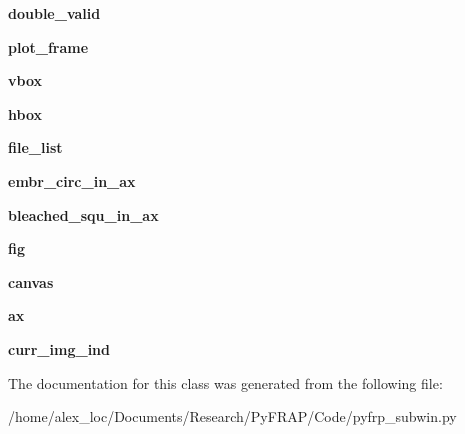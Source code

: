 \begin{DoxyCompactItemize}
\item 
\hypertarget{classpyfrp__subwin_1_1dataset__dialog_ad56a23783aa85c4b41facb9638f03760}{{\bfseries double\+\_\+valid}}\label{classpyfrp__subwin_1_1dataset__dialog_ad56a23783aa85c4b41facb9638f03760}

\item 
\hypertarget{classpyfrp__subwin_1_1dataset__dialog_acb31d11c26f7fe812fe364cf71338f02}{{\bfseries plot\+\_\+frame}}\label{classpyfrp__subwin_1_1dataset__dialog_acb31d11c26f7fe812fe364cf71338f02}

\item 
\hypertarget{classpyfrp__subwin_1_1dataset__dialog_ae24240e2dba1f4f12ee715fbc3ba61b5}{{\bfseries vbox}}\label{classpyfrp__subwin_1_1dataset__dialog_ae24240e2dba1f4f12ee715fbc3ba61b5}

\item 
\hypertarget{classpyfrp__subwin_1_1dataset__dialog_ace2f8210b483ad1c7e4a00847debce99}{{\bfseries hbox}}\label{classpyfrp__subwin_1_1dataset__dialog_ace2f8210b483ad1c7e4a00847debce99}

\item 
\hypertarget{classpyfrp__subwin_1_1dataset__dialog_a220f22596aa9ddd07e65716add38ff86}{{\bfseries file\+\_\+list}}\label{classpyfrp__subwin_1_1dataset__dialog_a220f22596aa9ddd07e65716add38ff86}

\item 
\hypertarget{classpyfrp__subwin_1_1dataset__dialog_afb8d536b0ac937cd0462d01da03dbc5e}{{\bfseries embr\+\_\+circ\+\_\+in\+\_\+ax}}\label{classpyfrp__subwin_1_1dataset__dialog_afb8d536b0ac937cd0462d01da03dbc5e}

\item 
\hypertarget{classpyfrp__subwin_1_1dataset__dialog_a36baea3ca286cdc7788f7046db808e38}{{\bfseries bleached\+\_\+squ\+\_\+in\+\_\+ax}}\label{classpyfrp__subwin_1_1dataset__dialog_a36baea3ca286cdc7788f7046db808e38}

\item 
\hypertarget{classpyfrp__subwin_1_1dataset__dialog_ac110b7db73fa5c58a246d64ce6c3bd46}{{\bfseries fig}}\label{classpyfrp__subwin_1_1dataset__dialog_ac110b7db73fa5c58a246d64ce6c3bd46}

\item 
\hypertarget{classpyfrp__subwin_1_1dataset__dialog_ad424cf7c8d39c30ed9a6a38c24fbc7e8}{{\bfseries canvas}}\label{classpyfrp__subwin_1_1dataset__dialog_ad424cf7c8d39c30ed9a6a38c24fbc7e8}

\item 
\hypertarget{classpyfrp__subwin_1_1dataset__dialog_accb1494c245e70d828101bacf82d91b5}{{\bfseries ax}}\label{classpyfrp__subwin_1_1dataset__dialog_accb1494c245e70d828101bacf82d91b5}

\item 
\hypertarget{classpyfrp__subwin_1_1dataset__dialog_aacfbaf31963675058dc4291dabc3c4f5}{{\bfseries curr\+\_\+img\+\_\+ind}}\label{classpyfrp__subwin_1_1dataset__dialog_aacfbaf31963675058dc4291dabc3c4f5}

\end{DoxyCompactItemize}


The documentation for this class was generated from the following file\+:\begin{DoxyCompactItemize}
\item 
/home/alex\+\_\+loc/\+Documents/\+Research/\+Py\+F\+R\+A\+P/\+Code/pyfrp\+\_\+subwin.\+py\end{DoxyCompactItemize}
